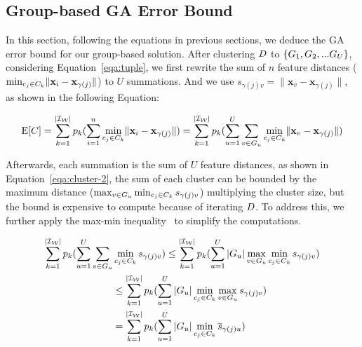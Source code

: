 




\subsection{Group-based GA Error Bound}

In this section, following the equations in previous sections, we deduce the GA error bound for our group-based solution. 
%
After clustering $D$ to $\{ G_1 , G_2, ...G_U\}$, considering Equation~\ref{eqa:tuple}, we  first rewrite the sum of $n$ feature distances (\ie $\min_{c_j\in C_k}\lVert\mathbf{x}_i - \mathbf{x}_{\gamma(j)}\rVert$) to $U$ summations. And we use $s_{\gamma(j)v} = \lVert\mathbf{x}_v - \mathbf{x}_{\gamma(j)}\rVert$, as shown in the following Equation:

\begin{equation}\label{eqa:cluster-1}
    \mathrm{E}[C] = \sum_{k= 1}^{|\mathcal{I_W}|} p_k (\sum_{i=1}^n \min_{c_j\in C_k}\lVert\mathbf{x}_i - \mathbf{x}_{\gamma(j)}\rVert) =  \sum_{k= 1}^{|\mathcal{I_W}|} p_k (\sum_{u=1}^U\sum_{v \in G_u} \min_{c_j\in C_k}\lVert\mathbf{x}_v - \mathbf{x}_{\gamma(j)}\rVert)
\end{equation}

Afterwards, each summation is the sum of $U$ feature distances, as shown in Equation~\ref{eqa:cluster-2},  the sum of each cluster can be bounded by  the maximum distance ($\max_{v \in G_u} \min_{c_j\in C_k} s_{\gamma(j)v}$)  multiplying the  cluster size, but the bound is expensive to compute because of iterating $D$. To address this, we further apply the max-min inequality~\cite{boyd2004convex} to simplify the computations. 


\begin{equation}\label{eqa:cluster-2}
    \begin{aligned}
        \sum_{k= 1}^{|\mathcal{I_W}|} p_k (\sum_{u=1}^U\sum_{v \in G_u} & \min_{c_j\in C_k} s_{\gamma(j)v}) \leq \sum_{k= 1}^{|\mathcal{I_W}|} p_k (\sum_{u=1}^U |G_u| \max_{v \in G_u} \min_{c_j\in C_k}s_{\gamma(j)v}) \\
        & \leq \sum_{k= 1}^{|\mathcal{I_W}|} p_k (\sum_{u=1}^U |G_u| \min_{c_j\in C_k} \max_{v \in G_u}s_{\gamma(j)v}) \\
        & =  \sum_{k= 1}^{|\mathcal{I_W}|} p_k (\sum_{u=1}^U |G_u| \min_{c_j\in C_k} \overline{s}_{\gamma(j)u})
    \end{aligned}
\end{equation}



